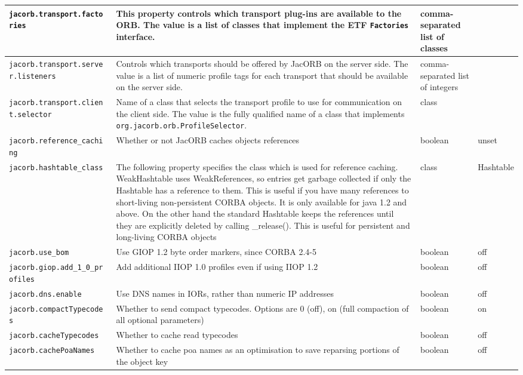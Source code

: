 {{\begin{small}
\begin{longtable}{|p{5cm}|p{7.5cm}|p{1.5cm}|p{1.5cm}|}
\verb"jacorb.transport.facto"
\verb"ries" & This property controls which transport plug-ins are
available to the ORB.  The value is a list of classes that implement the ETF
{\tt Factories} interface.
& comma-separated list of classes & \\
\hline
\verb"jacorb.transport.serve"
\verb"r.listeners" & Controls which transports should be offered by
JacORB on the server side.  The value is a list of numeric profile
tags for each transport that should be available on the server side.
& comma-separated list of integers & \\
\hline
\verb"jacorb.transport.clien"
\verb"t.selector" & Name of a class that selects the transport profile
to use for communication on the client side.  The value is the fully
qualified name of a class that implements {\tt
  org.jacorb.orb.ProfileSelector}.
& class & \\
\hline
\verb"jacorb.reference_cachi"
\verb"ng" & Whether or not JacORB caches objects references & boolean & unset  \\
\hline
\verb"jacorb.hashtable_class" & The following property specifies the
class which is used for reference caching. WeakHashtable uses
WeakReferences, so entries get garbage collected if only the Hashtable
has a reference to them. This is useful if you have many references to
short-living non-persistent CORBA objects. It is only available for
java 1.2 and above. On the other hand the standard Hashtable keeps the
references until they are explicitly deleted by calling
\_release(). This is useful for persistent and long-living CORBA
objects & class & Hashtable \\
\hline
\verb"jacorb.use_bom" & Use GIOP 1.2 byte order markers, since CORBA
2.4-5 & boolean & off  \\
\hline
\verb"jacorb.giop.add_1_0_pr"
\verb"ofiles" & Add additional IIOP 1.0 profiles even if using IIOP
1.2 & boolean & off \\
\hline
\verb"jacorb.dns.enable" & Use DNS names in IORs, rather than numeric
IP addresses & boolean & off \\
\hline
\verb"jacorb.compactTypecode"
\verb"s" & Whether to send compact typecodes. Options are 0 (off), on (full compaction of all optional parameters) & boolean & on \\
\hline
\verb"jacorb.cacheTypecodes" & Whether to cache read
typecodes  & boolean & off \\
\hline
\verb"jacorb.cachePoaNames" & Whether to cache poa names as an optimisation
to save reparsing portions of the object key& boolean & off \\

\end{longtable}
\end{small}}}
